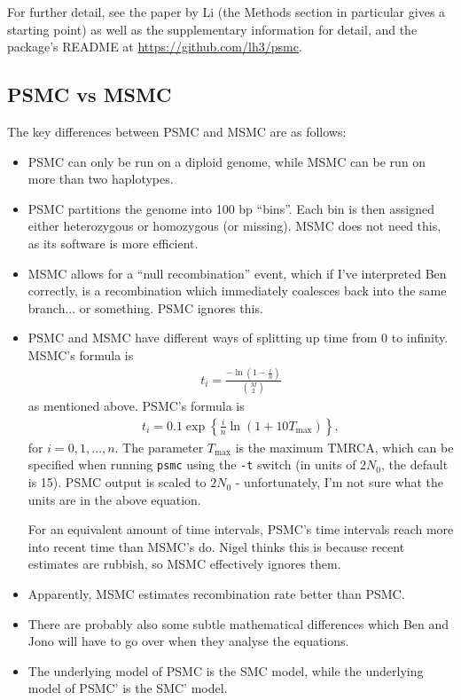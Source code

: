 \documentclass[11pt,a4paper]{article}
\begin{document}
For further detail, see the paper by Li \cite{li2011inference} (the Methods section in particular gives a starting point) as well as the supplementary information for detail, and the package's README at \url{https://github.com/lh3/psmc}.
\subsection{PSMC vs MSMC}
The key differences between PSMC and MSMC are as follows:
\begin{itemize}
\item PSMC can only be run on a diploid genome, while MSMC can be run on more than two haplotypes.
\item PSMC partitions the genome into 100 bp ``bins''. Each bin is then assigned either heterozygous or homozygous (or missing). MSMC does not need this, as its software is more efficient.
\item MSMC allows for a ``null recombination'' event, which if I've interpreted Ben correctly, is a recombination which immediately coalesces back into the same branch... or something. PSMC ignores this.
\item PSMC and MSMC have different ways of splitting up time from 0 to infinity. MSMC's formula is 
\begin{align*}
t_i = \frac{-\ln (1-\frac{i}{n})}{{M\choose 2}}
\end{align*}
as mentioned above. PSMC's formula is 
\begin{align*}
t_i = 0.1\exp\left\{ \frac{i}{n}\ln(1+10T_{\text{max}}) \right\},
\end{align*}
for $i = 0, 1, \dots, n$. The parameter $T_{\text{max}}$ is the maximum TMRCA, which can be specified when running \texttt{psmc} using the \texttt{-t} switch (in units of $2N_0$, the default is 15). PSMC output is scaled to $2N_0$ - unfortunately, I'm not sure what the units are in the above equation.

For an equivalent amount of time intervals, PSMC's time intervals reach more into recent time than MSMC's do. Nigel thinks this is because recent estimates are rubbish, so MSMC effectively ignores them.
\item Apparently, MSMC estimates recombination rate better than PSMC.
\item There are probably also some subtle mathematical differences which Ben and Jono will have to go over when they analyse the equations.
\item The underlying model of PSMC is the SMC model\cite{mcvean2005approximating}, while the underlying model of PSMC' is the SMC' model\cite{marjoram2006fast}.
\end{itemize}
\end{document}
